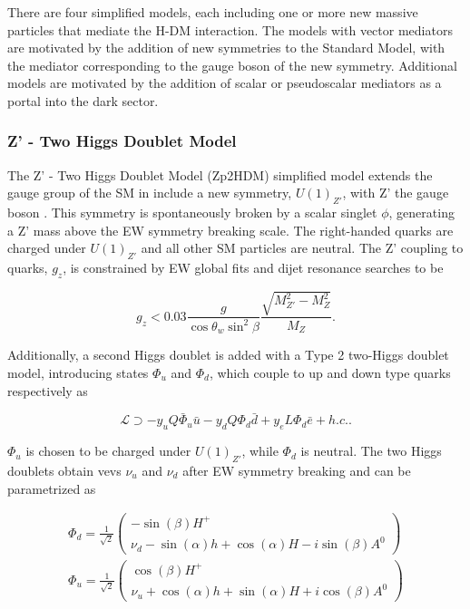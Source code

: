 \indent There are four simplified models, each including one or more new massive particles that mediate the H-DM interaction. The models with vector mediators are motivated by the addition of new symmetries to the Standard Model, with the mediator corresponding to the gauge boson of the new symmetry. Additional models are motivated by the addition of scalar or pseudoscalar mediators as a portal into the dark sector.

\subsubsection{Z' - Two Higgs Doublet Model}

The Z' - Two Higgs Doublet Model (Zp2HDM) simplified model extends the gauge group of the SM in include a new symmetry, $U(1)_{Z'}$, with Z' the gauge boson \cite{Berlin:2014cfa}. This symmetry is spontaneously broken by a scalar singlet $\phi$, generating a Z' mass above the EW symmetry breaking scale. The right-handed quarks are charged under $U(1)_{Z'}$ and all other SM particles are neutral. The Z' coupling to quarks, $g_z$, is constrained by EW global fits \cite{PhysRevD.86.010001} and dijet resonance searches \cite{Aaltonen:2008dn, Chatrchyan:2013qha} to be

\begin{equation}
g_z < 0.03 \frac{g}{\cos\theta_w\sin^2\beta}\frac{\sqrt{M_{Z'}^2-M_Z^2}}{M_Z}.
\end{equation}

Additionally, a second Higgs doublet is added with a Type 2 two-Higgs doublet model, introducing states $\Phi_u$ and $\Phi_d$, which couple to up and down type quarks respectively as

\begin{equation}
\mathcal{L} \supset -y_u Q \bar{\Phi}_u \bar{u} - y_d Q \Phi_d \bar{d} + y_e L \Phi_d \bar{e} + h.c..
\end{equation}

$\Phi_u$ is chosen to be charged under $U(1)_{Z'}$, while $\Phi_d$ is neutral. The two Higgs doublets obtain vevs $\nu_u$ and $\nu_d$ after EW symmetry breaking and can be parametrized as

\begin{equation}
\begin{split}
\Phi_d = \frac{1}{\sqrt{2}} \begin{pmatrix}-\sin(\beta) H^{+} \\ \nu_d - \sin(\alpha)h + \cos(\alpha)H - i\sin(\beta)A^0 \end{pmatrix} \\
\Phi_u = \frac{1}{\sqrt{2}} \begin{pmatrix} \cos(\beta)H^{+} \\  \nu_u + \cos(\alpha)h + \sin(\alpha)H + i\cos(\beta)A^0 \end{pmatrix}
\end{split}
\end{equation}

